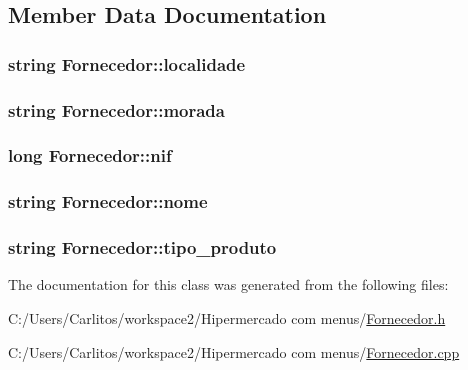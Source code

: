 \subsection{Member Data Documentation}
\hypertarget{class_fornecedor_a8ff7114779b124824241ee465aca2f79}{
\subsubsection[{localidade}]{\setlength{\rightskip}{0pt plus 5cm}string {\bf Fornecedor::localidade}}}
\label{class_fornecedor_a8ff7114779b124824241ee465aca2f79}
\hypertarget{class_fornecedor_ab6847360fd388f66d57c656bd916a8f6}{
\subsubsection[{morada}]{\setlength{\rightskip}{0pt plus 5cm}string {\bf Fornecedor::morada}}}
\label{class_fornecedor_ab6847360fd388f66d57c656bd916a8f6}
\hypertarget{class_fornecedor_afa19766928680454e0c5f67c298ef1c0}{
\subsubsection[{nif}]{\setlength{\rightskip}{0pt plus 5cm}long {\bf Fornecedor::nif}}}
\label{class_fornecedor_afa19766928680454e0c5f67c298ef1c0}
\hypertarget{class_fornecedor_ab048f688016d87d0f14d77aa19589cba}{
\subsubsection[{nome}]{\setlength{\rightskip}{0pt plus 5cm}string {\bf Fornecedor::nome}}}
\label{class_fornecedor_ab048f688016d87d0f14d77aa19589cba}
\hypertarget{class_fornecedor_aaf54ef880e221019f65111f72daa143e}{
\subsubsection[{tipo\_\-produto}]{\setlength{\rightskip}{0pt plus 5cm}string {\bf Fornecedor::tipo\_\-produto}}}
\label{class_fornecedor_aaf54ef880e221019f65111f72daa143e}


The documentation for this class was generated from the following files:\begin{DoxyCompactItemize}
\item 
C:/Users/Carlitos/workspace2/Hipermercado com menus/\hyperlink{_fornecedor_8h}{Fornecedor.h}\item 
C:/Users/Carlitos/workspace2/Hipermercado com menus/\hyperlink{_fornecedor_8cpp}{Fornecedor.cpp}\end{DoxyCompactItemize}
